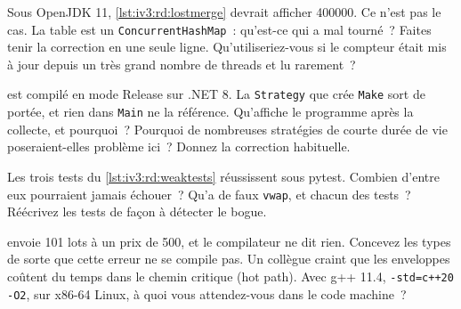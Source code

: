 \begin{question}\label{iq:iv3:reading-debugging-and-software-design:24}
Sous OpenJDK 11, \cref{lst:iv3:rd:lostmerge} devrait afficher 400000. Ce n'est pas le cas. La table est un \texttt{ConcurrentHashMap}~: qu'est-ce qui a mal tourné~? Faites tenir la correction en une seule ligne. Qu'utiliseriez-vous si le compteur était mis à jour depuis un très grand nombre de threads et lu rarement~?
\label{lst:iv3:rd:lostmerge}
\end{question}

\begin{question}\label{iq:iv3:reading-debugging-and-software-design:25}
 est compilé en mode Release sur .NET 8. La \texttt{Strategy} que crée \texttt{Make} sort de portée, et rien dans \texttt{Main} ne la référence. Qu'affiche le programme après la collecte, et pourquoi~? Pourquoi de nombreuses stratégies de courte durée de vie poseraient-elles problème ici~? Donnez la correction habituelle.
\label{lst:iv3:rd:eventleak}
\end{question}

\begin{question}\label{iq:iv3:reading-debugging-and-software-design:26}
Les trois tests du \cref{lst:iv3:rd:weaktests} réussissent sous pytest. Combien d'entre eux pourraient jamais échouer~? Qu'a de faux \texttt{vwap}, et chacun des tests~? Réécrivez les tests de façon à détecter le bogue.
\label{lst:iv3:rd:weaktests}
\end{question}

\begin{question}\label{iq:iv3:reading-debugging-and-software-design:27}
 envoie 101 lots à un prix de 500, et le compilateur ne dit rien. Concevez les types de sorte que cette erreur ne se compile pas. Un collègue craint que les enveloppes coûtent du temps dans le chemin critique (hot path). Avec g++ 11.4, \texttt{-std=c++20 -O2}, sur x86-64 Linux, à quoi vous attendez-vous dans le code machine~?
\label{lst:iv3:rd:swapped}
\end{question}


